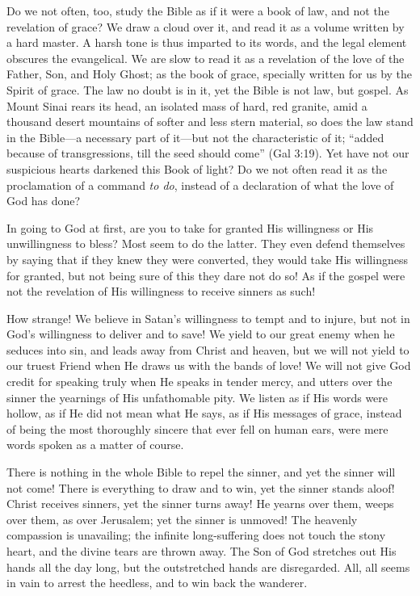 \documentclass[
]{book}
\begin{document}
Do we not often, too, study the Bible as if it were a book of law, and not the revelation of grace? We draw a cloud over it, and read it as a volume written by a hard master. A harsh tone is thus imparted to its words, and the legal element obscures the evangelical. We are slow to read it as a revelation of the love of the Father, Son, and Holy Ghost; as the book of grace, specially written for us by the Spirit of grace. The law no doubt is in it, yet the Bible is not law, but gospel. As Mount Sinai rears its head, an isolated mass of hard, red granite, amid a thousand desert mountains of softer and less stern material, so does the law stand in the Bible---a necessary part of it---but not the characteristic of it; ``added because of transgressions, till the seed should come'' (Gal 3:19). Yet have not our suspicious hearts darkened this Book of light? Do we not often read it as the proclamation of a command \emph{to do}, instead of a declaration of what the love of God has done?

In going to God at first, are you to take for granted His willingness or His unwillingness to bless? Most seem to do the latter. They even defend themselves by saying that if they knew they were converted, they would take His willingness for granted, but not being sure of this they dare not do so! As if the gospel were not the revelation of His willingness to receive sinners as such!

How strange! We believe in Satan's willingness to tempt and to injure, but not in God's willingness to deliver and to save! We yield to our great enemy when he seduces into sin, and leads away from Christ and heaven, but we will not yield to our truest Friend when He draws us with the bands of love! We will not give God credit for speaking truly when He speaks in tender mercy, and utters over the sinner the yearnings of His unfathomable pity. We listen as if His words were hollow, as if He did not mean what He says, as if His messages of grace, instead of being the most thoroughly sincere that ever fell on human ears, were mere words spoken as a matter of course.

There is nothing in the whole Bible to repel the sinner, and yet the sinner will not come! There is everything to draw and to win, yet the sinner stands aloof! Christ receives sinners, yet the sinner turns away! He yearns over them, weeps over them, as over Jerusalem; yet the sinner is unmoved! The heavenly compassion is unavailing; the infinite long-suffering does not touch the stony heart, and the divine tears are thrown away. The Son of God stretches out His hands all the day long, but the outstretched hands are disregarded. All, all seems in vain to arrest the heedless, and to win back the wanderer.
\end{document}
